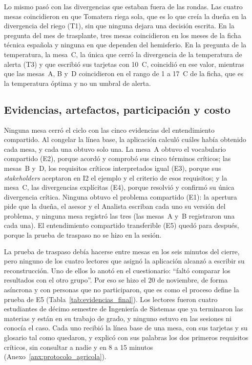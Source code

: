 \documentclass[12pt,letterpaper,oneside]{report}
\begin{document}
Lo mismo pasó con las divergencias que estaban fuera de las rondas. Las cuatro
mesas coincidieron en que Tomatera riega sola, que es lo que creía la dueña en
la divergencia del riego (T1), sin que ninguna dejara una decisión escrita. En
la pregunta del mes de trasplante, tres mesas coincidieron en los meses de la
ficha técnica española y ninguna en que dependen del hemisferio. En la pregunta
de la temperatura, la mesa~C, la única que cerró la divergencia de la
temperatura de alerta (T3) y que escribió sus tarjetas con 10~\textdegree C,
coincidió en ese valor, mientras que las mesas~A, B y~D coincidieron en el rango
de 1 a 17~\textdegree C de la ficha, que es la temperatura óptima y no un umbral
de alerta.

\subsection{Evidencias, artefactos, participación y costo}
\label{sec:evidencias_agricola}
Ninguna mesa cerró el ciclo con las cinco evidencias del entendimiento
compartido. Al congelar la línea base, la aplicación calculó cuáles había
obtenido cada mesa, y cada una obtuvo solo una. La mesa~A obtuvo el vocabulario
compartido (E2), porque acordó y comprobó sus cinco términos críticos; las
mesas~B y~D, los requisitos críticos interpretados igual (E3), porque sus
\textit{stakeholders} aceptaron en I2 el ejemplo y el criterio de esos
requisitos; y la mesa~C, las divergencias explícitas (E4), porque resolvió y
confirmó su única divergencia crítica. Ninguna obtuvo el problema compartido
(E1): la apertura pide que la dueña, el asesor y el Analista escriban cada uno
su versión del problema, y ninguna mesa registró las tres (las mesas~A y~B
registraron una cada una). El entendimiento compartido transferible (E5) quedó
para después, porque la prueba de traspaso no se hizo en la sesión.

La prueba de traspaso debía hacerse entre mesas en los seis minutos del cierre,
pero ninguno de los cuatro lectores que asignó la aplicación alcanzó a escribir
su reconstrucción. Uno de ellos lo anotó en el cuestionario: ``faltó comparar
los resultados con el otro grupo''. Por eso se hizo el 20 de noviembre, de forma
asíncrona y con personas que no participaron, que es como el proceso define la
prueba de E5 (Tabla~\ref{tab:evidencias_final}). Los lectores fueron cuatro
estudiantes de décimo semestre de Ingeniería de
Sistemas que ya terminaron las materias y están en su trabajo de grado, y
ninguno estuvo en las sesiones ni conocía el caso. Cada uno recibió la línea
base de una mesa, con sus tarjetas y su glosario tal como quedaron, y explicó
con sus palabras los dos primeros requisitos críticos, sin consultar a nadie y
en 8 a 15 minutos (Anexo~\ref{anx:protocolo_agricola}).
\end{document}
